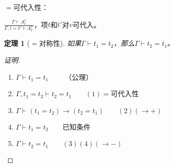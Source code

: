 \documentclass{article}
\newtheorem{Thm}{定理}
\begin{document}
\begin{CJK*}{UTF8}{gbsn}
$=$可代入性：

{\Large$\frac{\Gamma \vdash  A_t^v}{\Gamma,t=t' \vdash A_{t'}^v}$}，项$t$和$t'$对$v$可代入。

\begin{Thm}[$=$对称性]
  如果$\Gamma\vdash t_1=t_2$，那么$\Gamma\vdash t_2=t_1$。
\end{Thm}
\begin{proof}[证明]
$\qquad$

\begin{enumerate}
  \item $\Gamma\vdash t_1=t_1\qquad$ （公理）
  \item $\Gamma, t_1=t_2\vdash t_2=t_1\qquad(1)=$可代入性
  \item $\Gamma\vdash (t_1=t_2)\to (t_2=t_1)\qquad(2)(\to +)$
  \item $\Gamma\vdash t_1=t_2\qquad$已知条件
  \item $\Gamma\vdash t_2=t_1\qquad(3)(4)(\to-)$
\end{enumerate}
\end{proof}


\end{CJK*}
\end{document}
